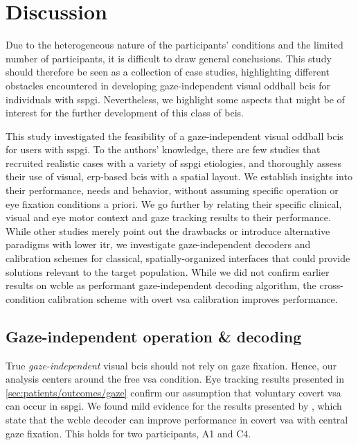\documentclass{article}
\begin{document}
\section{Discussion}
Due to the heterogeneous nature of the participants' conditions and the limited
number of participants, it is difficult to draw general conclusions.
This study should therefore be seen as a collection of case studies,
highlighting different obstacles encountered in developing gaze-independent
visual oddball \acp{bci} for individuals with \ac{sspgi}.
Nevertheless, we highlight some aspects that might be
of interest for the further development of this class of \acp{bci}.

This study investigated the feasibility of a gaze-independent visual oddball
\acp{bci} for users with \acf{sspgi}.
To the authors' knowledge, there are few studies that recruited realistic cases
with a variety of \ac{sspgi} etiologies, and thoroughly assess their use of
visual, \ac{erp}-based \acp{bci} with a spatial layout.
We establish insights into their performance, needs and behavior,
without assuming specific operation or eye fixation conditions a priori.
We go further by relating their specific clinical, visual and eye motor context
and gaze tracking results to their performance.
While other studies merely point out the drawbacks or introduce alternative
paradigms with lower \ac{itr}, we investigate gaze-independent decoders and
calibration schemes for classical, spatially-organized interfaces that could
provide solutions relevant to the target population.
While we did not confirm earlier results on \ac{wcble} as performant gaze-independent
decoding algorithm,
the cross-condition calibration scheme with overt \ac{vsa} calibration
improves performance.


\subsection{Gaze-independent operation \& decoding}
True \emph{gaze-independent} visual \acp{bci} should not rely on gaze fixation.
Hence, our analysis centers around the free \ac{vsa} condition.
Eye tracking results presented in \cref{sec:patients/outcomes/gaze}
confirm our assumption that voluntary covert \ac{vsa} can
occur in  \ac{sspgi}.
We found mild evidence for the results presented by \textcite{VanDenKerchove2024},
which state that the \ac{wcble} decoder can improve performance in covert
\ac{vsa} with central gaze fixation.
This holds for two participants, A1 and C4.
\end{document}
